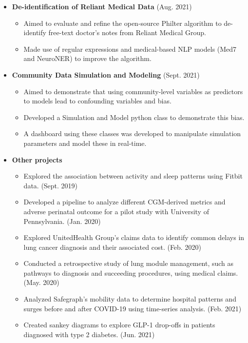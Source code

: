 \documentclass[letterpaper,11pt]{article}
\newcommand{\resitem}[1]{\item #1 \vspace{-2pt}}
\begin{document}
\begin{itemize}
\begin{itemize}
        \end{itemize}    
    \item \textbf{De-identification of Reliant Medical Data} (Aug. 2021)\vspace{-5pt}
        \begin{itemize}
    		\resitem{Aimed to evaluate and refine the open-source Philter algorithm to de-identify free-text doctor's notes from Reliant Medical Group.}
    		\resitem{Made use of regular expressions and medical-based NLP models (Med7 and NeuroNER) to improve the algorithm.}
        \end{itemize}  
        
\pagebreak
        
    \item \textbf{Community Data Simulation and Modeling} (Sept. 2021)\vspace{-5pt}
        \begin{itemize}
    		\resitem{Aimed to demonstrate that using community-level variables as predictors to models lead to confounding variables and bias.}
    		\resitem{Developed a Simulation and Model python class to demonstrate this bias.}
    		\resitem{A dashboard using these classes was developed to manipulate simulation parameters and model these in real-time.}
        \end{itemize}
	\item \textbf{Other projects}\vspace{-5pt}
    	\begin{itemize}
    	    \resitem{Explored the association between activity and sleep patterns using Fitbit data. (Sept. 2019)}
    	    \resitem{Developed a pipeline to analyze different CGM-derived metrics and adverse perinatal outcome for a pilot study with University of Pennsylvania. (Jan. 2020)}
    	    \resitem{Explored UnitedHealth Group's claims data to identify common delays in lung cancer diagnosis and their associated cost. (Feb. 2020)}
    	    \resitem{Conducted a retrospective study of lung module management, such as pathways to diagnosis and succeeding procedures, using medical claims. (May. 2020)}
    	    \resitem{Analyzed Safegraph's mobility data to determine hospital patterns and surges before and after COVID-19 using time-series analysis. (Feb. 2021)}
    	    \resitem{Created sankey diagrams to explore GLP-1 drop-offs in patients diagnosed with type 2 diabetes. (Jun. 2021)}
    	    
    	\end{itemize}
\end{itemize}
\end{document}
